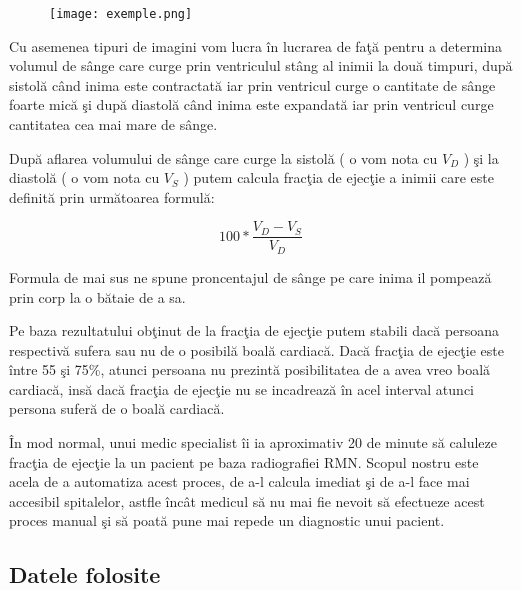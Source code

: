 \begin{figure}[h!]
  \centering
  \texttt{[image: exemple.png]}
\end{figure}

Cu asemenea tipuri de imagini vom lucra \^{i}n lucrarea de fa\c{t}\u{a} pentru a determina volumul de s\^{a}nge care curge prin ventriculul st\^{a}ng al inimii la dou\u{a} timpuri, dup\u{a} sistol\u{a} c\^{a}nd inima este contractat\u{a} iar prin ventricul curge o cantitate de s\^{a}nge foarte mic\u{a} \c{s}i dup\u{a} diastol\u{a} c\^{a}nd inima este expandat\u{a} iar prin ventricul curge cantitatea cea mai mare de s\^{a}nge.
\par
Dup\u{a} aflarea volumului de s\^{a}nge care curge la sistol\u{a} ( o vom nota cu \textbf{\textit{$V_D$}} ) \c{s}i la diastol\u{a} ( o vom nota cu \textbf{\textit{$V_S$}} ) putem calcula frac\c{t}ia de ejec\c{t}ie a inimii care este definit\u{a} prin urm\u{a}toarea formul\u{a}:

$$100 * \frac{V_D - V_S}{V_D}$$

Formula de mai sus ne spune proncentajul de s\^{a}nge pe care inima il pompeaz\u{a} prin corp la o b\u{a}taie de a sa.
\par
Pe baza rezultatului ob\c{t}inut de la frac\c{t}ia de ejec\c{t}ie putem stabili dac\u{a} persoana respectiv\u{a} sufera sau nu de o posibil\u{a} boal\u{a} cardiac\u{a}. Dac\u{a} frac\c{t}ia de ejec\c{t}ie este \^{i}ntre 55 \c{s}i 75\%, atunci persoana nu prezint\u{a} posibilitatea de a avea vreo boal\u{a} cardiac\u{a}, ins\u{a} dac\u{a} frac\c{t}ia de ejec\c{t}ie nu se incadreaz\u{a} \^{i}n acel interval atunci persona sufer\u{a} de o boal\u{a} cardiac\u{a}.
\par
\^{I}n mod normal, unui medic specialist \^{i}i ia aproximativ 20 de minute s\u{a} caluleze frac\c{t}ia de ejec\c{t}ie la un pacient pe baza radiografiei RMN. Scopul nostru este acela de a automatiza acest proces, de a-l calcula imediat \c{s}i de a-l face mai accesibil spitalelor, astfle \^{i}nc\^{a}t medicul s\u{a} nu mai fie nevoit s\u{a} efectueze acest proces manual \c{s}i s\u{a} poat\u{a} pune mai repede un diagnostic unui pacient.

\subsection{Datele folosite}

